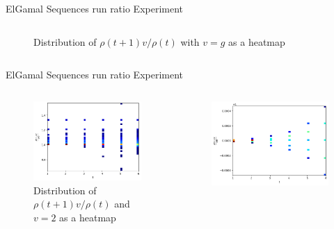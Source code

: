 \begin{frame}{ElGamal Sequences run ratio Experiment}
\begin{columns}
\begin{column}{0.45\textwidth}
\begin{figure}
                \caption{Distribution of $\rho(t+1)v/\rho(t)$ with $v = g$ as a heatmap}
            \end{figure}
        \end{column}
    \end{columns}
\end{frame}

\begin{frame}{ElGamal Sequences run ratio Experiment}
    \begin{columns}
        \begin{column}{0.45\textwidth}
            \begin{figure}
                \centering
                \includegraphics[width=\textwidth]{figures/v2Normalizedrunratio.png}
                \caption{Distribution of $\rho(t+1)v/\rho(t)$ and $v = 2$ as a heatmap}
            \end{figure}
        \end{column}
        \begin{column}{0.45\textwidth}
            \begin{figure}
                \centering
                \includegraphics[width=\textwidth]{figures/v2AndvisGenNormalizedrunratio.png}

\end{figure}
\end{column}
\end{columns}
\end{frame}
